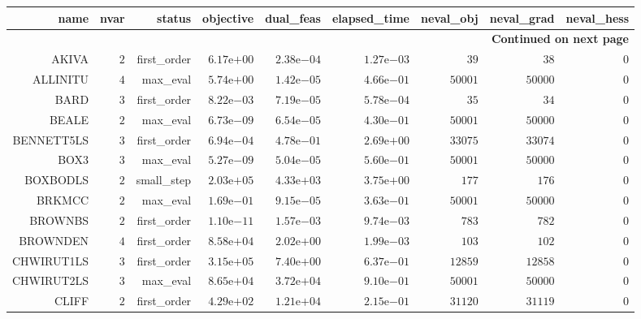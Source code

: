 \begin{longtable}{rrrrrrrrr}
\hline
name & nvar & status & objective & dual\_feas & elapsed\_time & neval\_obj & neval\_grad & neval\_hess \\\hline
\endhead
\hline
\multicolumn{9}{r}{{\bfseries Continued on next page}}\\
\hline
\endfoot
\endlastfoot
AKIVA & \(     2\) & first\_order & \( 6.17\)e\(+00\) & \( 2.38\)e\(-04\) & \( 1.27\)e\(-03\) & \(    39\) & \(    38\) & \(     0\) \\
ALLINITU & \(     4\) & max\_eval & \( 5.74\)e\(+00\) & \( 1.42\)e\(-05\) & \( 4.66\)e\(-01\) & \( 50001\) & \( 50000\) & \(     0\) \\
BARD & \(     3\) & first\_order & \( 8.22\)e\(-03\) & \( 7.19\)e\(-05\) & \( 5.78\)e\(-04\) & \(    35\) & \(    34\) & \(     0\) \\
BEALE & \(     2\) & max\_eval & \( 6.73\)e\(-09\) & \( 6.54\)e\(-05\) & \( 4.30\)e\(-01\) & \( 50001\) & \( 50000\) & \(     0\) \\
BENNETT5LS & \(     3\) & first\_order & \( 6.94\)e\(-04\) & \( 4.78\)e\(-01\) & \( 2.69\)e\(+00\) & \( 33075\) & \( 33074\) & \(     0\) \\
BOX3 & \(     3\) & max\_eval & \( 5.27\)e\(-09\) & \( 5.04\)e\(-05\) & \( 5.60\)e\(-01\) & \( 50001\) & \( 50000\) & \(     0\) \\
BOXBODLS & \(     2\) & small\_step & \( 2.03\)e\(+05\) & \( 4.33\)e\(+03\) & \( 3.75\)e\(+00\) & \(   177\) & \(   176\) & \(     0\) \\
BRKMCC & \(     2\) & max\_eval & \( 1.69\)e\(-01\) & \( 9.15\)e\(-05\) & \( 3.63\)e\(-01\) & \( 50001\) & \( 50000\) & \(     0\) \\
BROWNBS & \(     2\) & first\_order & \( 1.10\)e\(-11\) & \( 1.57\)e\(-03\) & \( 9.74\)e\(-03\) & \(   783\) & \(   782\) & \(     0\) \\
BROWNDEN & \(     4\) & first\_order & \( 8.58\)e\(+04\) & \( 2.02\)e\(+00\) & \( 1.99\)e\(-03\) & \(   103\) & \(   102\) & \(     0\) \\
CHWIRUT1LS & \(     3\) & first\_order & \( 3.15\)e\(+05\) & \( 7.40\)e\(+00\) & \( 6.37\)e\(-01\) & \( 12859\) & \( 12858\) & \(     0\) \\
CHWIRUT2LS & \(     3\) & max\_eval & \( 8.65\)e\(+04\) & \( 3.72\)e\(+04\) & \( 9.10\)e\(-01\) & \( 50001\) & \( 50000\) & \(     0\) \\
CLIFF & \(     2\) & first\_order & \( 4.29\)e\(+02\) & \( 1.21\)e\(+04\) & \( 2.15\)e\(-01\) & \( 31120\) & \( 31119\) & \(     0\) \\

\end{longtable}
